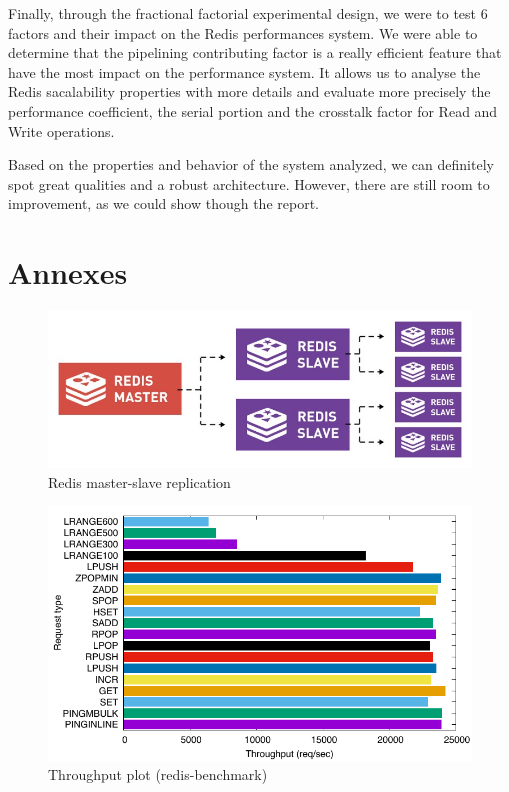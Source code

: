 \documentclass[runningheads]{llncs}
\begin{document}
Finally, through the fractional factorial experimental design, we were to test 6 factors and their impact on the Redis performances system. We were able to determine that the pipelining contributing factor is a really efficient feature that have the most impact on the performance system. 
It allows us to analyse the Redis sacalability properties with more details and evaluate more precisely the performance coefficient, the serial portion and the crosstalk factor for Read and Write operations.

Based on the properties and behavior of the system analyzed, we can definitely spot great qualities and a robust architecture. However, there are still room to improvement, as we could show though the report.

\newpage
\section{Annexes}
\begin{figure}
\centering
\includegraphics[scale=0.4]{images/redis-replciation.jpg}
\caption{Redis master-slave replication}
\end{figure}

\begin{figure}
\centering
\includegraphics[scale=0.8]{images/simple_benchmark.pdf}
\caption{Throughput plot (redis-benchmark)}
\end{figure}
\end{document}

